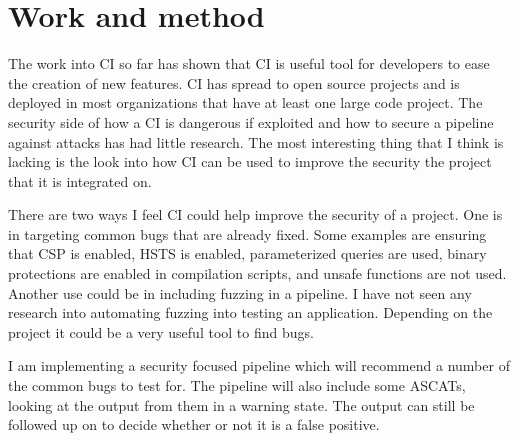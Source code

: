 \section{Work and method}
	The work into CI so far has shown that CI is useful tool for developers to ease the creation of new features. CI has spread to open source projects and is deployed in most organizations that have 
    at least one large code project. The security side of how a CI is dangerous if exploited and how to secure a pipeline against attacks has had little research. The most interesting thing that I 
    think is lacking is the look into how CI can be used to improve the security the project that it is integrated on.
	
	There are two ways I feel CI could help improve the security of a project. One is in targeting common bugs that are already fixed. Some examples are ensuring that CSP is enabled, HSTS is enabled,
    parameterized queries are used, binary protections are enabled in compilation scripts, and unsafe functions are not used. Another use could be in including fuzzing in a pipeline. I have not seen 
    any research into automating fuzzing into testing an application. Depending on the project it could be a very useful tool to find bugs.

	I am implementing a security focused pipeline which will recommend a number of the common bugs to test for. The pipeline will also include some ASCATs, looking at the output from them in a 
    warning state. The output can still be followed up on to decide whether or not it is a false positive.

